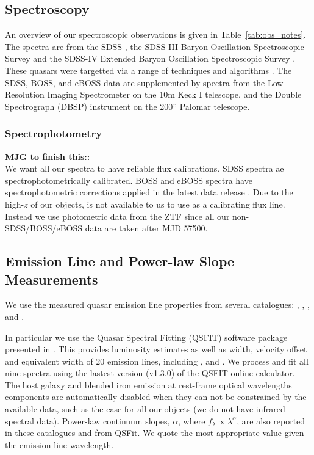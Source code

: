 \documentclass[a4paper,fleqn,usenatbib]{mnras}
\begin{document}
\subsection{Spectroscopy}
An overview of our spectroscopic observations is given in
Table~\ref{tab:obs_notes}.  The spectra are from the SDSS
\citep{Stoughton2002, DR7, Schneider2010}, the SDSS-III Baryon
Oscillation Spectroscopic Survey \citep[BOSS; ][]{Eisenstein2011,
Dawson2013, Smee2013, Alam2015, Paris2017} and the SDSS-IV Extended
Baryon Oscillation Spectroscopic Survey \citep[eBOSS; ][]{Dawson2016,
Abolfathi2018, Paris2018}.  These quasars were targetted via a range
of techniques and algorithms \citep[see ][]{Richards2002, Ross2012,
Myers2015}. The SDSS, BOSS, and eBOSS data are supplemented by
spectra from the Low Resolution Imaging Spectrometer \citep[LRIS; ][]{Oke1995} on the 10m
Keck {\sc I} telescope.  and the Double Spectrograph
(DBSP) instrument on the 200'' Palomar telescope.

\subsubsection{Spectrophotometry}
{\bf MJG to finish this::} \\
We want all our spectra to have reliable flux calibrations.  SDSS
spectra ae spectrophotometrically calibrated.  BOSS and eBOSS spectra
have spectrophotometric corrections applied in the latest data release
\citep{Hutchinson2016, Jensen2016, Margala2016}.  Due to the high-$z$
of our objects, \oiii is not available to us to use as a calibrating
flux line. Instead we use photometric data from the ZTF since all our
non-SDSS/BOSS/eBOSS data are taken after MJD 57500.


\subsection{Emission Line and Power-law Slope Measurements}
We use the measured quasar emission line properties from several catalogues: 
\citet{Shen2011}, \citet{Hamann2017}, \citet{Kozlowski2017}, and
\citet{Calderone2017}.

In particular we use the Quasar Spectral Fitting (QSFIT) software
package presented in \citet{Calderone2017}. This provides luminosity
estimates as well as width, velocity offset and equivalent width of 20
emission lines, including \civ, \ciii and \mgii.  We process and fit
all nine spectra using the lastest version (v1.3.0) of the QSFIT
\href{https://qsfit.inaf.it/cat_1.30/onlinefit.php}{online
calculator}.
The host galaxy and blended iron emission at rest-frame optical
wavelengths components are automatically disabled when they can not be
constrained by the available data, such as the case for all our
objects (we do not have infrared spectral data).
Power-law continuum slopes, $\alpha$, where $f_{\lambda} \propto
\lambda^{\alpha}$, are also reported in these catalogues and from
QSFit.  We quote the most appropriate value given the emission line
wavelength.
\end{document}
